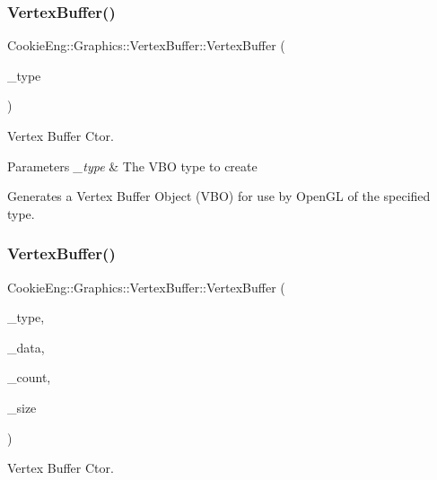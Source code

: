 \subsubsection{\texorpdfstring{Vertex\+Buffer()}{VertexBuffer()}\hspace{0.1cm}{\footnotesize\ttfamily [1/2]}}
{\footnotesize\ttfamily Cookie\+Eng\+::\+Graphics\+::\+Vertex\+Buffer\+::\+Vertex\+Buffer (\begin{DoxyParamCaption}\item[{const Vertex\+Buffer\+Type}]{\+\_\+type }\end{DoxyParamCaption})}



Vertex Buffer Ctor. 


\begin{DoxyParams}{Parameters}
{\em \+\_\+type} & The V\+BO type to create\\
\hline
\end{DoxyParams}
Generates a Vertex Buffer Object (V\+BO) for use by Open\+GL of the specified type. \mbox{\label{class_cookie_eng_1_1_graphics_1_1_vertex_buffer_af4ceb32a35ff5747f2f80c8cec1e7800}} 
\subsubsection{\texorpdfstring{Vertex\+Buffer()}{VertexBuffer()}\hspace{0.1cm}{\footnotesize\ttfamily [2/2]}}
{\footnotesize\ttfamily Cookie\+Eng\+::\+Graphics\+::\+Vertex\+Buffer\+::\+Vertex\+Buffer (\begin{DoxyParamCaption}\item[{const Vertex\+Buffer\+Type}]{\+\_\+type,  }\item[{const void $\ast$}]{\+\_\+data,  }\item[{G\+Luint}]{\+\_\+count,  }\item[{G\+Luint}]{\+\_\+size }\end{DoxyParamCaption})}



Vertex Buffer Ctor. 


